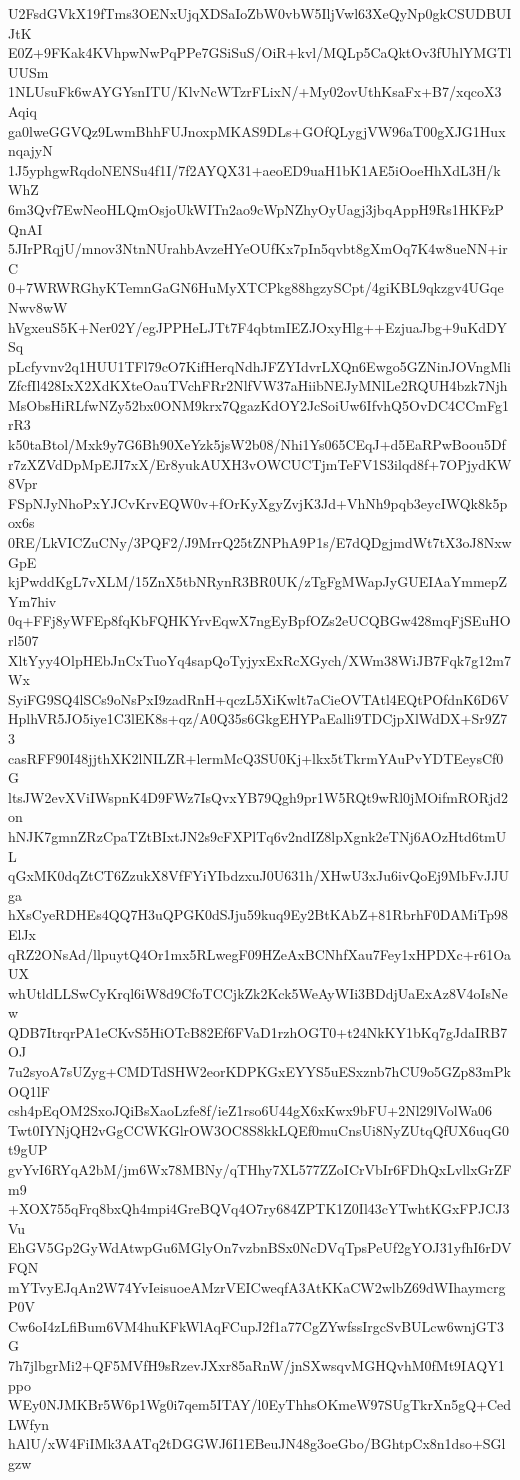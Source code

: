 U2FsdGVkX19fTms3OENxUjqXDSaIoZbW0vbW5IljVwl63XeQyNp0gkCSUDBUIJtK
E0Z+9FKak4KVhpwNwPqPPe7GSiSuS/OiR+kvl/MQLp5CaQktOv3fUhlYMGTlUUSm
1NLUsuFk6wAYGYsnITU/KlvNcWTzrFLixN/+My02ovUthKsaFx+B7/xqcoX3Aqiq
ga0lweGGVQz9LwmBhhFUJnoxpMKAS9DLs+GOfQLygjVW96aT00gXJG1HuxnqajyN
1J5yphgwRqdoNENSu4f1I/7f2AYQX31+aeoED9uaH1bK1AE5iOoeHhXdL3H/kWhZ
6m3Qvf7EwNeoHLQmOsjoUkWITn2ao9cWpNZhyOyUagj3jbqAppH9Rs1HKFzPQnAI
5JIrPRqjU/mnov3NtnNUrahbAvzeHYeOUfKx7pIn5qvbt8gXmOq7K4w8ueNN+irC
0+7WRWRGhyKTemnGaGN6HuMyXTCPkg88hgzySCpt/4giKBL9qkzgv4UGqeNwv8wW
hVgxeuS5K+Ner02Y/egJPPHeLJTt7F4qbtmIEZJOxyHlg++EzjuaJbg+9uKdDYSq
pLcfyvnv2q1HUU1TFl79cO7KifHerqNdhJFZYIdvrLXQn6Ewgo5GZNinJOVngMli
ZfcfIl428IxX2XdKXteOauTVchFRr2NlfVW37aHiibNEJyMNlLe2RQUH4bzk7Njh
MsObsHiRLfwNZy52bx0ONM9krx7QgazKdOY2JcSoiUw6IfvhQ5OvDC4CCmFg1rR3
k50taBtol/Mxk9y7G6Bh90XeYzk5jsW2b08/Nhi1Ys065CEqJ+d5EaRPwBoou5Df
r7zXZVdDpMpEJI7xX/Er8yukAUXH3vOWCUCTjmTeFV1S3ilqd8f+7OPjydKW8Vpr
FSpNJyNhoPxYJCvKrvEQW0v+fOrKyXgyZvjK3Jd+VhNh9pqb3eycIWQk8k5pox6s
0RE/LkVICZuCNy/3PQF2/J9MrrQ25tZNPhA9P1s/E7dQDgjmdWt7tX3oJ8NxwGpE
kjPwddKgL7vXLM/15ZnX5tbNRynR3BR0UK/zTgFgMWapJyGUEIAaYmmepZYm7hiv
0q+FFj8yWFEp8fqKbFQHKYrvEqwX7ngEyBpfOZs2eUCQBGw428mqFjSEuHOrl507
XltYyy4OlpHEbJnCxTuoYq4sapQoTyjyxExRcXGych/XWm38WiJB7Fqk7g12m7Wx
SyiFG9SQ4lSCs9oNsPxI9zadRnH+qczL5XiKwlt7aCieOVTAtl4EQtPOfdnK6D6V
HplhVR5JO5iye1C3lEK8s+qz/A0Q35s6GkgEHYPaEalli9TDCjpXlWdDX+Sr9Z73
casRFF90I48jjthXK2lNILZR+lermMcQ3SU0Kj+lkx5tTkrmYAuPvYDTEeysCf0G
ltsJW2evXViIWspnK4D9FWz7IsQvxYB79Qgh9pr1W5RQt9wRl0jMOifmRORjd2on
hNJK7gmnZRzCpaTZtBIxtJN2s9cFXPlTq6v2ndIZ8lpXgnk2eTNj6AOzHtd6tmUL
qGxMK0dqZtCT6ZzukX8VfFYiYIbdzxuJ0U631h/XHwU3xJu6ivQoEj9MbFvJJUga
hXsCyeRDHEs4QQ7H3uQPGK0dSJju59kuq9Ey2BtKAbZ+81RbrhF0DAMiTp98ElJx
qRZ2ONsAd/llpuytQ4Or1mx5RLwegF09HZeAxBCNhfXau7Fey1xHPDXc+r61OaUX
whUtldLLSwCyKrql6iW8d9CfoTCCjkZk2Kck5WeAyWIi3BDdjUaExAz8V4oIsNew
QDB7ItrqrPA1eCKvS5HiOTcB82Ef6FVaD1rzhOGT0+t24NkKY1bKq7gJdaIRB7OJ
7u2syoA7sUZyg+CMDTdSHW2eorKDPKGxEYYS5uESxznb7hCU9o5GZp83mPkOQ1lF
csh4pEqOM2SxoJQiBsXaoLzfe8f/ieZ1rso6U44gX6xKwx9bFU+2Nl29lVolWa06
Twt0IYNjQH2vGgCCWKGlrOW3OC8S8kkLQEf0muCnsUi8NyZUtqQfUX6uqG0t9gUP
gvYvI6RYqA2bM/jm6Wx78MBNy/qTHhy7XL577ZZoICrVbIr6FDhQxLvllxGrZFm9
+XOX755qFrq8bxQh4mpi4GreBQVq4O7ry684ZPTK1Z0Il43cYTwhtKGxFPJCJ3Vu
EhGV5Gp2GyWdAtwpGu6MGlyOn7vzbnBSx0NcDVqTpsPeUf2gYOJ31yfhI6rDVFQN
mYTvyEJqAn2W74YvIeisuoeAMzrVEICweqfA3AtKKaCW2wlbZ69dWIhaymcrgP0V
Cw6oI4zLfiBum6VM4huKFkWlAqFCupJ2f1a77CgZYwfssIrgcSvBULcw6wnjGT3G
7h7jlbgrMi2+QF5MVfH9sRzevJXxr85aRnW/jnSXwsqvMGHQvhM0fMt9IAQY1ppo
WEy0NJMKBr5W6p1Wg0i7qem5ITAY/l0EyThhsOKmeW97SUgTkrXn5gQ+CedLWfyn
hAlU/xW4FiIMk3AATq2tDGGWJ6I1EBeuJN48g3oeGbo/BGhtpCx8n1dso+SGlgzw
